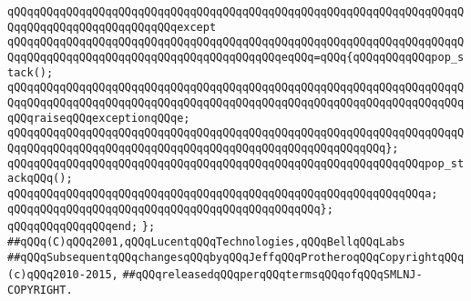 \verb|qQQqqQQqqQQqqQQqqQQqqQQqqQQqqQQqqQQqqQQqqQQqqQQqqQQqqQQqqQQqqQQqqQQqqQQqqQQqqQQqqQQqqQQqqQQqqQQqexcept|\newline
\verb|qQQqqQQqqQQqqQQqqQQqqQQqqQQqqQQqqQQqqQQqqQQqqQQqqQQqqQQqqQQqqQQqqQQqqQQqqQQqqQQqqQQqqQQqqQQqqQQqqQQqqQQqqQQqqQQqeqQQq=qQQq{qQQqqQQqqQQqpop_stack();|\newline
\verb|qQQqqQQqqQQqqQQqqQQqqQQqqQQqqQQqqQQqqQQqqQQqqQQqqQQqqQQqqQQqqQQqqQQqqQQqqQQqqQQqqQQqqQQqqQQqqQQqqQQqqQQqqQQqqQQqqQQqqQQqqQQqqQQqqQQqqQQqqQQqqQQqraiseqQQqexceptionqQQqe;|\newline
\verb|qQQqqQQqqQQqqQQqqQQqqQQqqQQqqQQqqQQqqQQqqQQqqQQqqQQqqQQqqQQqqQQqqQQqqQQqqQQqqQQqqQQqqQQqqQQqqQQqqQQqqQQqqQQqqQQqqQQqqQQqqQQqqQQq};|\newline
\newline
\verb|qQQqqQQqqQQqqQQqqQQqqQQqqQQqqQQqqQQqqQQqqQQqqQQqqQQqqQQqqQQqqQQqpop_stackqQQq();|\newline
\newline
\verb|qQQqqQQqqQQqqQQqqQQqqQQqqQQqqQQqqQQqqQQqqQQqqQQqqQQqqQQqqQQqqQQqa;|\newline
\verb|qQQqqQQqqQQqqQQqqQQqqQQqqQQqqQQqqQQqqQQqqQQqqQQq};|\newline
\verb|qQQqqQQqqQQqqQQqend;|\newline
\verb|};|\newline
\newline
\newline
\verb|##qQQq(C)qQQq2001,qQQqLucentqQQqTechnologies,qQQqBellqQQqLabs|\newline
\verb|##qQQqSubsequentqQQqchangesqQQqbyqQQqJeffqQQqProtheroqQQqCopyrightqQQq(c)qQQq2010-2015,|\newline
\verb|##qQQqreleasedqQQqperqQQqtermsqQQqofqQQqSMLNJ-COPYRIGHT.|\newline

